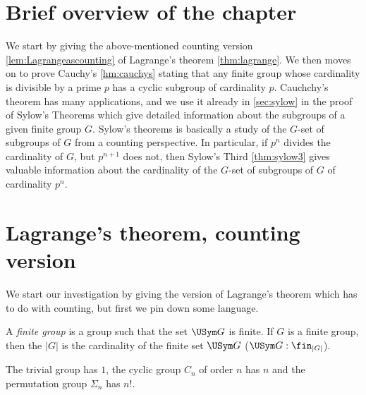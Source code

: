 
\section{Brief overview of the chapter}
\label{sec:fingp-overview}
We start by giving the above-mentioned counting version \cref{lem:Lagrangeascounting} of Lagrange's theorem \cref{thm:lagrange}.  
We then moves on to prove Cauchy's \cref{hm:cauchys} stating that any finite group whose cardinality is divisible by a prime $p$ has a cyclic subgroup of cardinality $p$.
Cauchchy's theorem has many applications, and we use it already in \cref{sec:sylow} in the proof of Sylow's Theorems which give detailed information about the subgroups of a given finite group $G$.  Sylow's theorems is basically a study of the $G$-set of subgroups of $G$ from a counting perspective.  
In particular, if $p^n$ divides the cardinality of $G$, but $p^{n+1}$ does not, then Sylow's Third \cref{thm:sylow3} gives valuable information about the cardinality of the $G$-set of subgroups of $G$ of cardinality $p^n$.


\section{Lagrange's theorem, counting version}
\label{sec:Lagrangecounting}

We start our investigation by giving the version of Lagrange's theorem which has to do with counting, but first we pin down some language.
\begin{definition}
  \label{def:finitegrd}
A \emph{finite group} is a group such that the set $\USym G$ is finite.   If $G$ is a finite group, then the \emph{\gporder}\index{\gporder} $|G|$ is the cardinality of the finite set $\USym G$ (\ie $\USym G:\fin_{|G|}$).
\end{definition}
\begin{example}
  The trivial group has \gporder $1$, the cyclic group $C_n$ of order $n$ has \gporder $n$ %
and the permutation group $\Sigma_n$ has \gporder $n!$.
\end{example}


